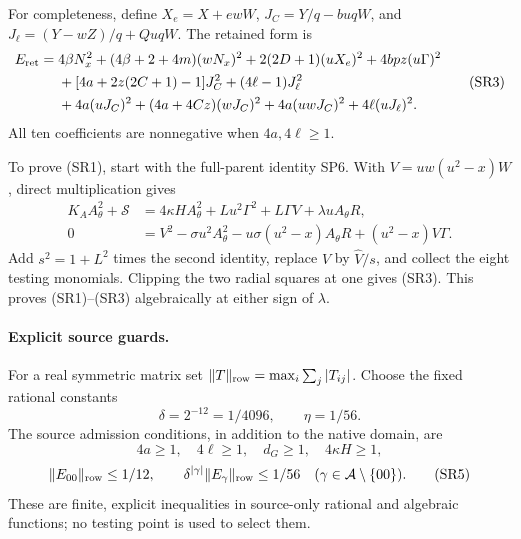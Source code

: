 For completeness, define $X_e=X+ewW$,
$J_C=Y/q-buqW$, and $J_\ell=(Y-wZ)/q+QuqW$. The retained form is
\[
\begin{aligned}
E_{\rm ret}={}&4\beta N_x^2+(4\beta+2+4m)(wN_x)^2
 +2(2D+1)(uX_e)^2+4bpz(u\Gamma)^2\\
&+[4a+2z(2C+1)-1]J_C^2+(4\ell-1)J_\ell^2\\
&+4a(uJ_C)^2+(4a+4Cz)(wJ_C)^2
       +4a(uwJ_C)^2+4\ell(uJ_\ell)^2.
\end{aligned}\tag{SR3}
\]
All ten coefficients are nonnegative when $4a,4\ell\ge1$.

To prove (SR1), start with the full-parent identity SP6. With
$V=uw(u^2-x)W$, direct multiplication gives
\[
\begin{aligned}
 K_AA_\theta^2+\mathscr S
 &=4\kappa H A_\theta^2+Lu^2\Gamma^2+L\Gamma V
                                       +\lambda uA_\theta R,\\
0&=V^2-\sigma u^2A_\theta^2-u\sigma(u^2-x)A_\theta R
                                      +(u^2-x)V\Gamma.
\end{aligned}
\]
Add $s^2=1+L^2$ times the second identity, replace $V$ by
$\widehat V/s$, and collect the eight testing monomials. Clipping
the two radial squares at one gives (SR3). This proves (SR1)--(SR3)
algebraically at either sign of $\lambda$.

\paragraph{Explicit source guards.}
For a real symmetric matrix set
$\|T\|_{\rm row}=\max_i\sum_j|T_{ij}|$. Choose the fixed rational
constants
\[
 \delta=2^{-12}=1/4096,\qquad \eta=1/56.
\]
The source admission conditions, in addition to the native domain, are
\[
 4a\ge1,\quad4\ell\ge1,\quad d_G\ge1,\quad4\kappa H\ge1,
 \tag{SR4}
\]
\[
 \|E_{00}\|_{\rm row}\le1/12,\qquad
 \delta^{|\gamma|}\|E_\gamma\|_{\rm row}\le1/56
                   \quad(\gamma\in\mathcal A\setminus\{00\}).
 \tag{SR5}
\]
These are finite, explicit inequalities in source-only rational and
algebraic functions; no testing point is used to select them.

